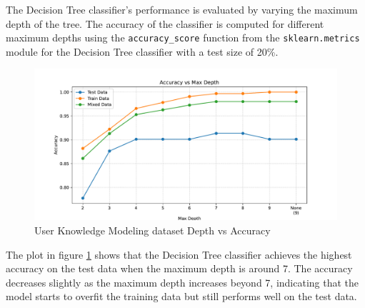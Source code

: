 The Decision Tree classifier's performance is evaluated by varying the maximum depth of the tree. The accuracy of the classifier is computed for different maximum depths using the \texttt{accuracy\_score} function from the \texttt{sklearn.metrics} module for the Decision Tree classifier with a test size of 20\%.

\begin{figure}[H]
    \centering
    \includegraphics[width=\textwidth]{figures/user_knowledge_modeling_accuracy_vs_max_depth.pdf}
    \caption{User Knowledge Modeling dataset Depth vs Accuracy}
    \label{fig:user_knowledge_modeling_accuracy_vs_max_depth}
\end{figure}

The plot in figure \ref{fig:user_knowledge_modeling_accuracy_vs_max_depth} shows that the Decision Tree classifier achieves the highest accuracy on the test data when the maximum depth is around 7. The accuracy decreases slightly as the maximum depth increases beyond 7, indicating that the model starts to overfit the training data but still performs well on the test data.

